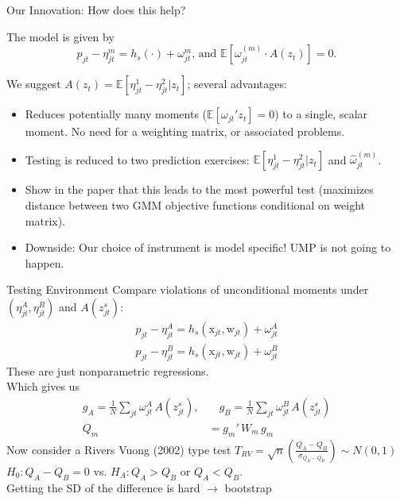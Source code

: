 \documentclass[aspectratio=169,10pt]{beamer}
\begin{document}
\begin{frame}[plain,label=innovation]{Our Innovation: How does this help?}
\begin{small}
The model is given by
$$p_{jt} - \eta^m_{jt} = h_s(\cdot) +  \omega^m_{jt} \text{,   and  } \mathbb{E}[\omega_{jt}^{(m)}\cdot A(z_t)] = 0.$$

We suggest $A(z_t) = \mathbb{E}[\eta^1_{jt}-\eta_{jt}^2|z_{t}]$; several advantages:

\begin{itemize}
\item Reduces potentially many moments ($\mathbb{E}[\omega_{jt}' z_t]=0$) to a single, scalar moment. No need for a weighting matrix, or associated problems.
\item Testing is reduced to two prediction exercises: $\mathbb{E}[\eta^1_{jt}-\eta_{jt}^2|z_{t}]$ and $\widehat \omega_{jt}^{(m)}$.
\item Show in the paper that this leads to the most powerful test (maximizes distance between two GMM objective functions conditional on weight matrix).
\item Downside: Our choice of instrument is \alert{model specific}! UMP is not going to happen.
\end{itemize}
\end{small}
\end{frame}



\begin{frame}{Testing Environment}
Compare violations of unconditional moments under $(\eta_{jt}^A, \eta_{jt}^B)$ and $A(z_{jt}^s)$:
\begin{align*}
p_{jt} -  \eta_{jt}^A = h_s(\textrm{x}_{jt},\textrm{w}_{jt}) + \omega_{jt}^{A}\\
p_{jt} -  \eta_{jt}^B = h_s(\textrm{x}_{jt},\textrm{w}_{jt}) + \omega_{jt}^{B}
\end{align*}
These are just \alert{nonparametric regressions}.\\

Which gives us
\begin{align*}
g_A = \frac{1}{N} \sum_{jt} \omega_{jt}^{A}\, A(z_{jt}^s), &\quad
g_B =\frac{1}{N} \sum_{jt}  \omega_{jt}^{B}\, A(z_{jt}^s)\\
Q_m &= g_m'\, W_m\, g_m
\end{align*}
Now consider a \alert{Rivers Vuong (2002)} type test $T_{RV} = \sqrt{n} \left(\frac{Q_A - Q_B}{\sigma_{Q_A - Q_B}}\right) \sim N(0,1)$
$H_0: Q_A - Q_B=0$ vs. $H_A: Q_A > Q_B$ or $Q_A < Q_B$.\\
Getting the SD of the difference is hard $\rightarrow$ bootstrap 
\end{frame}
\end{document}
